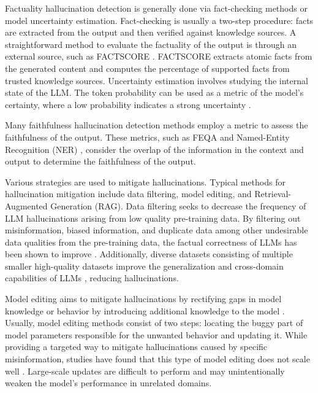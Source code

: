 \documentclass[english, 12pt, a4paper, sci, utf8, a-2b, online]{latex/definitions/aaltothesis}
\begin{document}
Factuality hallucination detection is generally done via fact-checking methods or model uncertainty estimation. Fact-checking is usually a two-step procedure: facts are extracted from the output and then verified against knowledge sources. A straightforward method to evaluate the factuality of the output is through an external source, such as FACTSCORE \cite{min2023factscorefinegrainedatomicevaluation}. FACTSCORE extracts atomic facts from the generated content and computes the percentage of supported facts from trusted knowledge sources. Uncertainty estimation involves studying the internal state of the LLM. The token probability can be used as a metric of the model's certainty, where a low probability indicates a strong uncertainty \cite{varshney2023stitchtimesavesnine}.

Many faithfulness hallucination detection methods employ a metric to assess the faithfulness of the output. These metrics, such as FEQA \cite{durmus-etal-2020-feqa} and Named-Entity Recognition (NER) \cite{nan-etal-2021-entity}, consider the overlap of the information in the context and output to determine the faithfulness of the output. 

Various strategies are used to mitigate hallucinations. Typical methods for hallucination mitigation include data filtering, model editing, and Retrieval-Augmented Generation (RAG). Data filtering seeks to decrease the frequency of LLM hallucinations arising from low quality pre-training data. By filtering out misinformation, biased information, and duplicate data among other undesirable data qualities from the pre-training data, the factual correctness of LLMs has been shown to improve \cite{gunasekar2023textbooksneed}. Additionally, diverse datasets consisting of multiple smaller high-quality datasets improve the generalization and cross-domain capabilities of LLMs \cite{gao2020pile800gbdatasetdiverse}, reducing hallucinations.

Model editing aims to mitigate hallucinations by rectifying gaps in model knowledge or behavior by introducing additional knowledge to the model \cite{10.1145/3703155}. Usually, model editing methods consist of two steps: locating the buggy part of model parameters responsible for the unwanted behavior and updating it. While providing a targeted way to mitigate hallucinations caused by specific misinformation, studies have found that this type of model editing does not scale well \cite{yao2023editinglargelanguagemodels}. Large-scale updates are difficult to perform and may unintentionally weaken the model's performance in unrelated domains.
\end{document}
